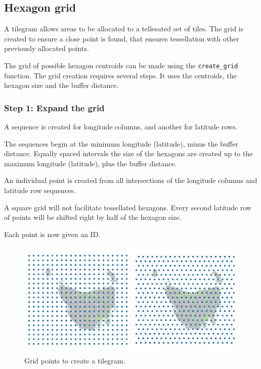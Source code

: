 \hypertarget{hexagon-grid}{%
\subsection{Hexagon grid}\label{hexagon-grid}}

A tilegram allows areas to be allocated to a tellesated set of tiles.
The grid is created to ensure a close point is found, that ensures
tessellation with other previously allocated points.

The grid of possible hexagon centroids can be made using the
\texttt{create\_grid} function. The grid creation requires several
steps. It uses the centroids, the hexagon size and the buffer distance.

\hypertarget{step-1-expand-the-grid}{%
\subsubsection{Step 1: Expand the grid}\label{step-1-expand-the-grid}}

A sequence is created for longitude columns, and another for latitude
rows.

The sequences begin at the minimum longitude (latitude), minus the
buffer distance. Equally spaced intervals the size of the hexagons are
created up to the maximum longitude (latitude), plus the buffer
distance.

An individual point is created from all intersections of the longitude
columns and latitude row sequences.

A square grid will not facilitate tessellated hexagons. Every second
latitude row of points will be shifted right by half of the hexagon
size.

Each point is now given an ID.

\begin{Schunk}
\begin{figure}
\includegraphics{algorithmRjournal_files/figure-latex/unnamed-chunk-3-1} \caption[Grid points to create a tilegram]{Grid points to create a tilegram.}\label{fig:unnamed-chunk-3}
\end{figure}
\end{Schunk}

